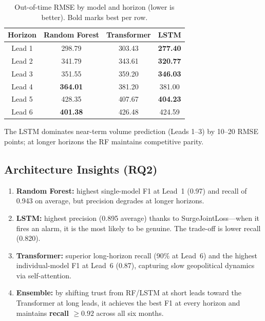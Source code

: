 \documentclass[11pt, a4paper]{article}
\begin{document}
\begin{table}[ht]
  \centering
  \caption{Out-of-time RMSE by model and horizon (lower is better).
  Bold marks best per row.}
  \label{tab:rmse}
  \small
  \begin{tabular}{c c c c}
    \toprule
    \textbf{Horizon} & \textbf{Random Forest} & \textbf{Transformer} & \textbf{LSTM} \\
    \midrule
    Lead 1 & 298.79 & 303.43 & \textbf{277.40} \\
    Lead 2 & 341.79 & 343.61 & \textbf{320.77} \\
    Lead 3 & 351.55 & 359.20 & \textbf{346.03} \\
    Lead 4 & \textbf{364.01} & 381.20 & 381.00 \\
    Lead 5 & 428.35 & 407.67 & \textbf{404.23} \\
    Lead 6 & \textbf{401.38} & 426.48 & 424.59 \\
    \bottomrule
  \end{tabular}
\end{table}

The LSTM dominates near-term volume prediction (Leads 1--3) by 10--20 RMSE points; at
longer horizons the RF maintains competitive parity.


\subsection{Architecture Insights (RQ2)}

\begin{enumerate}
  \item \textbf{Random Forest:} highest single-model F1 at Lead~1 (0.97) and recall of
        0.943 on average, but precision degrades at longer horizons.
  \item \textbf{LSTM:} highest precision (0.895 average) thanks to SurgeJointLoss---when
        it fires an alarm, it is the most likely to be genuine.  The trade-off is lower
        recall (0.820).
  \item \textbf{Transformer:} superior long-horizon recall (90\% at Lead~6) and the
        highest individual-model F1 at Lead~6 (0.87), capturing slow geopolitical
        dynamics via self-attention.
  \item \textbf{Ensemble:} by shifting trust from RF/LSTM at short leads toward the
        Transformer at long leads, it achieves the best F1 at every horizon and
        maintains \textbf{recall $\geq 0.92$} across all six months.
\end{enumerate}
\end{document}

